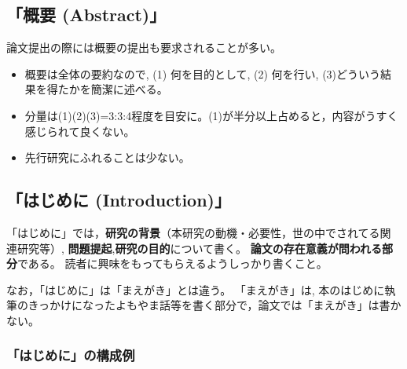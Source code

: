 \documentclass[12pt, ]{jsarticle}
\providecommand{\tightlist}{%
   \setlength{\itemsep}{0pt}\setlength{\parskip}{0pt}}
\begin{document}
\hypertarget{ux6982ux8981-abstract}{%
\subsection{「概要 (Abstract)」}\label{ux6982ux8981-abstract}}

論文提出の際には概要の提出も要求されることが多い。

\begin{itemize}
\tightlist
\item
  概要は全体の要約なので, (1) 何を目的として, (2) 何を行い,
  (3)どういう結果を得たかを簡潔に述べる。
\item
  分量は(1)(2)(3)=3:3:4程度を目安に。(1)が半分以上占めると，内容がうすく感じられて良くない。
\item
  先行研究にふれることは少ない。
\end{itemize}

\hypertarget{ux306fux3058ux3081ux306b-introduction}{%
\subsection{「はじめに
(Introduction)」}\label{ux306fux3058ux3081ux306b-introduction}}

「はじめに」では，\textbf{研究の背景}（本研究の動機・必要性，世の中でされてる関
連研究等）, \textbf{問題提起},\textbf{研究の目的}について書く。
\textbf{論文の存在意義が問われる部分}である。
読者に興味をもってもらえるようしっかり書くこと。

なお，「はじめに」は「まえがき」とは違う。 「まえがき」は,
本のはじめに執筆のきっかけになったよもやま話等を書く部分で，論文では「まえがき」は書かない。

\hypertarget{ux306fux3058ux3081ux306bux306eux69cbux6210ux4f8b}{%
\subsubsection{「はじめに」の構成例}\label{ux306fux3058ux3081ux306bux306eux69cbux6210ux4f8b}}
\end{document}
